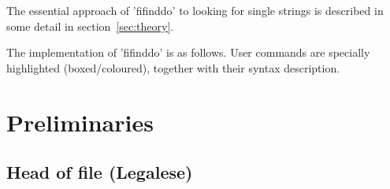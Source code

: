 \documentclass{article}
\begin{document}
The essential approach of 'fifinddo' to looking for single strings is 
described in some detail in section~\ref{sec:theory}.

The implementation of 'fifinddo' is as follows.
User commands are specially highlighted (boxed\slash coloured), 
together with their syntax description. 


\section{Preliminaries}
\subsection{Head of file (Legalese)}
\sloppy 
\ProcessLineMessage{}
\end{document}
